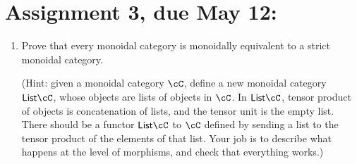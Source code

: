 \documentclass[12pt]{amsart}
\begin{document}
\section{Assignment 3, due May 12:}
\begin{enumerate}
\item Prove that every monoidal category is monoidally equivalent to a strict monoidal category.

(Hint: given a monoidal category $\cC$, define a new monoidal category $\mathsf{List} \cC$, whose objects are lists of objects in $\cC$. In $\mathsf{List} \cC$, tensor product of objects is concatenation of lists, and the tensor unit is the empty list. There should be a functor $\mathsf{List} \cC$ to $\cC$ defined by sending a list to the tensor product of the elements of that list. Your job is to describe what happens at the level of morphisms, and check that everything works.)




\end{enumerate}
\end{document}
